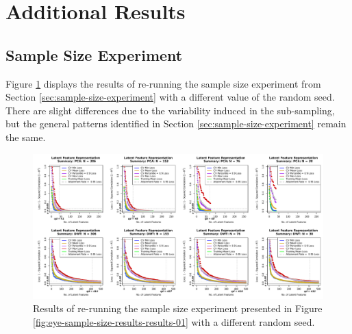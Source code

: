 \section{Additional Results}\label{sec:additional-results}

\subsection{Sample Size Experiment}

Figure \ref{fig:eye-sample-size-results-results-02} displays the results of re-running the sample size experiment from Section \ref{sec:sample-size-experiment} with a different value of the random seed.
There are slight differences due to the variability induced in the sub-sampling, but the general patterns identified in Section \ref{sec:sample-size-experiment} remain the same.

\begin{figure}
    \centering
    \includegraphics[width=1\linewidth]{figures/eye-sample-size-results-results-02.pdf}
    \caption{Results of re-running the sample size experiment presented in Figure \ref{fig:eye-sample-size-results-results-01} with a different random seed.}
    \label{fig:eye-sample-size-results-results-02}
\end{figure}
